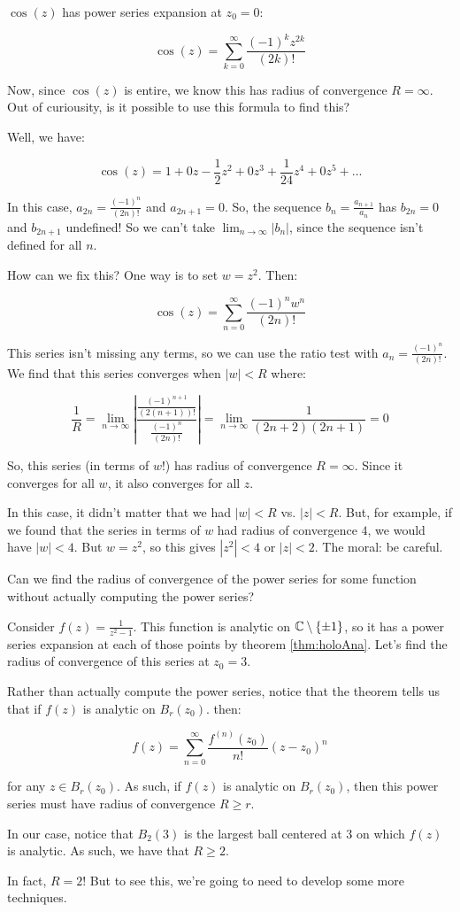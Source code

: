 \begin{ex}{}{} $\cos(z)$ has power series expansion at $z_0 = 0$:

$$\cos(z) = \sum_{k = 0}^\infty \frac{(-1)^kz^{2k}}{(2k)!}$$

Now, since $\cos(z)$ is entire, we know this has radius of convergence $R = \infty$. Out of curiousity, is it possible to use this formula to find this?

Well, we have:

$$\cos(z) = 1 + 0z -\frac{1}{2}z^2 + 0z^3 + \frac{1}{24}z^4 + 0z^5 + ...$$

In this case, $a_{2n} = \frac{(-1)^n}{(2n)!}$ and $a_{2n+1} = 0$. So, the sequence $b_n = \frac{a_{n+1}}{a_n}$ has $b_{2n} = 0$ and $b_{2n+1}$ undefined! So we can't take $\lim_{n\rightarrow \infty}|b_n|$, since the sequence isn't defined for all $n$.

How can we fix this? One way is to set $w = z^2$. Then:

$$\cos(z) = \sum_{n = 0}^\infty \frac{(-1)^nw^n}{(2n)!}$$

This series isn't missing any terms, so we can use the ratio test with $a_n = \frac{(-1)^n}{(2n)!}$. We find that this series converges when $|w| < R$ where:

$$\frac{1}{R} = \lim_{n\rightarrow \infty} \left| \frac{\frac{(-1)^{n+1}}{(2(n+1))!}}{\frac{(-1)^n}{(2n)!}}\right| = \lim_{n\rightarrow \infty} \frac{1}{(2n+2)(2n+1)} = 0$$

So, this series (in terms of $w$!) has radius of convergence $R = \infty$. Since it converges for all $w$, it also converges for all $z$.
\end{ex}

In this case, it didn't matter that we had $|w| < R$ vs. $|z| < R$. But, for example, if we found that the series in terms of $w$ had radius of convergence $4$, we would have $|w| < 4$. But $w = z^2$, so this gives $|z^2|< 4$ or $|z| < 2$. The moral: be careful.

Can we find the radius of convergence of the power series for some function without actually computing the power series?
	
\begin{ex}{}{} Consider $f(z) = \frac{1}{z^2 - 1}$. This function is analytic on $\mathbb{C}\setminus\{\pm1\}$, so it has a power series expansion at each of those points by theorem \ref{thm:holoAna}. Let's find the radius of convergence of this series at $z_0 = 3$.

Rather than actually compute the power series, notice that the theorem tells us that if $f(z)$ is analytic on $B_r(z_0)$. then:

$$f(z) = \sum_{n = 0}^\infty \frac{f^{(n)}(z_0)}{n!}(z-z_0)^n$$

\noin for any $z\in B_r(z_0)$. As such, if $f(z)$ is analytic on $B_r(z_0)$, then this power series must have radius of convergence $R \ge r$.

In our case, notice that $B_2(3)$ is the largest ball centered at $3$ on which $f(z)$ is analytic. As such, we have that $R\ge 2$.

In fact, $R = 2$! But to see this, we're going to need to develop some more techniques.
\end{ex}

